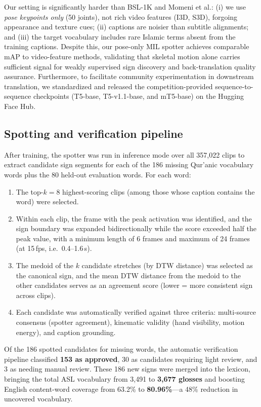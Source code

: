 Our setting is significantly harder than BSL-1K and Momeni et al.: (i) we use \emph{pose keypoints only} (50 joints), not rich video features (I3D, S3D), forgoing appearance and texture cues; (ii) captions are noisier than subtitle alignments; and (iii) the target vocabulary includes rare Islamic terms absent from the training captions. Despite this, our pose-only MIL spotter achieves comparable mAP to video-feature methods, validating that skeletal motion alone carries sufficient signal for weakly supervised sign discovery and back-translation quality assurance. Furthermore, to facilitate community experimentation in downstream translation, we standardized and released the competition-provided sequence-to-sequence checkpoints (T5-base, T5-v1.1-base, and mT5-base) on the Hugging Face Hub.

\subsection{Spotting and verification pipeline}
After training, the spotter was run in inference mode over all 357,022 clips to extract candidate sign segments for each of the 186 missing Qur'anic vocabulary words plus the 80 held-out evaluation words. For each word:
\begin{enumerate}[leftmargin=*,itemsep=2pt]
  \item The top-$k{=}8$ highest-scoring clips (among those whose caption contains the word) were selected.
  \item Within each clip, the frame with the peak activation was identified, and the sign boundary was expanded bidirectionally while the score exceeded half the peak value, with a minimum length of 6 frames and maximum of 24 frames (at 15\,fps, i.e.\ 0.4--1.6\,s).
  \item The medoid of the $k$ candidate stretches (by DTW distance) was selected as the canonical sign, and the mean DTW distance from the medoid to the other candidates serves as an agreement score (lower = more consistent sign across clips).
  \item Each candidate was automatically verified against three criteria: multi-source consensus (spotter agreement), kinematic validity (hand visibility, motion energy), and caption grounding.
\end{enumerate}
Of the 186 spotted candidates for missing words, the automatic verification pipeline classified \textbf{153 as approved}, 30 as candidates requiring light review, and 3 as needing manual review. These 186 new signs were merged into the lexicon, bringing the total ASL vocabulary from 3,491 to \textbf{3,677 glosses} and boosting English content-word coverage from 63.2\% to \textbf{80.96\%}---a 48\% reduction in uncovered vocabulary.

